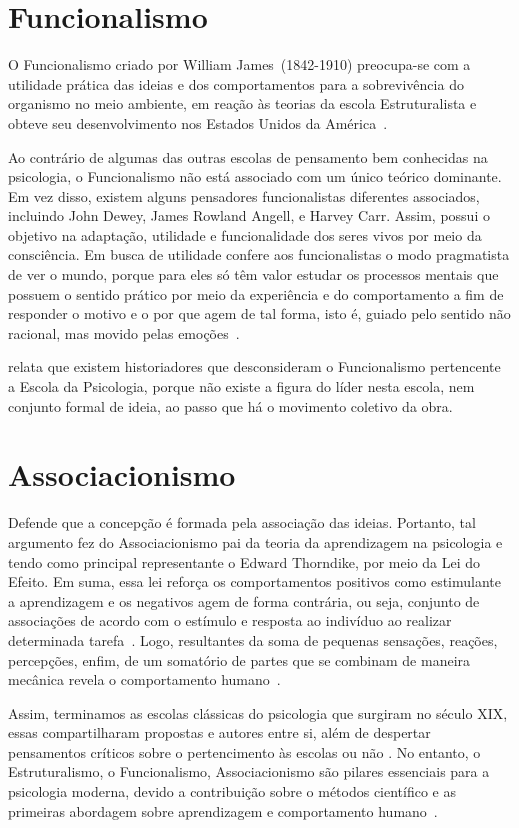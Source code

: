 \section{Funcionalismo}\label{funcionalismo}

O Funcionalismo criado por William James~(1842-1910) preocupa-se com a utilidade prática das ideias e dos comportamentos para a sobrevivência do organismo no meio ambiente, em reação às teorias da escola Estruturalista e obteve seu desenvolvimento nos Estados Unidos da América~\cite{hothersall1997historia}.

Ao contrário de algumas das outras escolas de pensamento bem conhecidas na psicologia, o Funcionalismo não está associado com um único teórico dominante. 
Em vez disso, existem alguns pensadores funcionalistas diferentes associados, incluindo John Dewey, James Rowland Angell, e Harvey Carr.
Assim, possui o objetivo na adaptação, utilidade e funcionalidade dos seres vivos por meio da consciência.
Em busca de utilidade confere aos funcionalistas o modo pragmatista de ver o mundo, porque para eles só têm valor estudar os processos mentais que possuem o sentido prático por meio da experiência e do comportamento a fim de responder o motivo e o por que agem de tal forma, isto é, guiado pelo sentido não racional, mas movido pelas emoções~\cite{bock1999psicologias,silva2007psicologia_educacao}.

 relata que existem historiadores que desconsideram o Funcionalismo pertencente a Escola da Psicologia, porque não existe a figura do líder nesta escola, nem conjunto formal de ideia, ao passo que há o movimento coletivo da obra. 


\section{Associacionismo}

Defende que a concepção é formada pela associação das ideias.
Portanto, tal argumento fez do Associacionismo pai da teoria da aprendizagem na psicologia e tendo como principal representante o Edward Thorndike, por meio da Lei do Efeito.
Em suma, essa lei reforça os comportamentos positivos como estimulante a aprendizagem e os negativos agem de forma contrária, ou seja, conjunto de associações de acordo com o estímulo e resposta ao indivíduo ao realizar determinada tarefa~\cite{bock1999psicologias}.
Logo, resultantes da soma de pequenas sensações, reações, percepções, enfim, de um somatório de partes que se combinam de maneira mecânica revela o comportamento humano~\cite{hothersall1997historia}.


Assim, terminamos as escolas clássicas do psicologia que surgiram no século XIX, essas compartilharam propostas e autores entre si, além de despertar pensamentos críticos sobre o pertencimento às escolas ou não \cite{hothersall1997historia}.
No entanto, o Estruturalismo, o Funcionalismo, Associacionismo são pilares essenciais para a psicologia moderna, devido a contribuição sobre o métodos científico e as primeiras abordagem sobre aprendizagem e comportamento humano~\cite{bock1999psicologias}.
